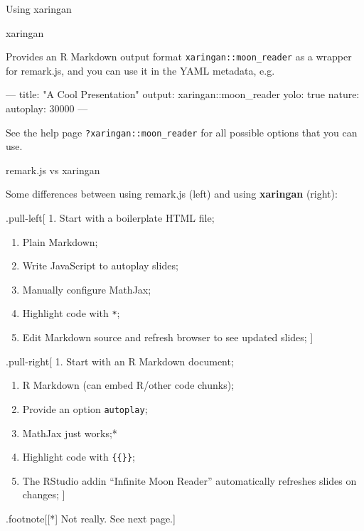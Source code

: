 \documentclass[ignorenonframetext,]{beamer}
\newenvironment{Shaded}{\begin{snugshade}}{\end{snugshade}}
\newcommand{\AttributeTok}[1]{\textcolor[rgb]{0.77,0.63,0.00}{#1}}
\newcommand{\FunctionTok}[1]{\textcolor[rgb]{0.00,0.00,0.00}{#1}}
\newcommand{\OtherTok}[1]{\textcolor[rgb]{0.56,0.35,0.01}{#1}}
\newcommand{\StringTok}[1]{\textcolor[rgb]{0.31,0.60,0.02}{#1}}
\begin{document}
\begin{frame}{Using xaringan}
\protect\hypertarget{using-xaringan}{}

\end{frame}

\begin{frame}[fragile]{xaringan}
\protect\hypertarget{xaringan}{}

Provides an R Markdown output format \texttt{xaringan::moon\_reader} as
a wrapper for remark.js, and you can use it in the YAML metadata, e.g.

\begin{Shaded}
\begin{Highlighting}[]
\OtherTok{---}
\FunctionTok{title:}\AttributeTok{ }\StringTok{"A Cool Presentation"}
\FunctionTok{output:}
  \FunctionTok{xaringan:}\AttributeTok{:moon_reader}
    \FunctionTok{yolo:}\AttributeTok{ true}
    \FunctionTok{nature:}
      \FunctionTok{autoplay:}\AttributeTok{ 30000}
\OtherTok{---}
\end{Highlighting}
\end{Shaded}

See the help page \texttt{?xaringan::moon\_reader} for all possible
options that you can use.

\end{frame}

\begin{frame}[fragile]{remark.js vs xaringan}
\protect\hypertarget{remark.js-vs-xaringan}{}

Some differences between using remark.js (left) and using
\textbf{xaringan} (right):

.pull-left{[} 1. Start with a boilerplate HTML file;

\begin{enumerate}
\item
  Plain Markdown;
\item
  Write JavaScript to autoplay slides;
\item
  Manually configure MathJax;
\item
  Highlight code with \texttt{*};
\item
  Edit Markdown source and refresh browser to see updated slides; {]}
\end{enumerate}

.pull-right{[} 1. Start with an R Markdown document;

\begin{enumerate}
\item
  R Markdown (can embed R/other code chunks);
\item
  Provide an option \texttt{autoplay};
\item
  MathJax just works;*
\item
  Highlight code with \texttt{\{\{\}\}};
\item
  The RStudio addin ``Infinite Moon Reader'' automatically refreshes
  slides on changes; {]}
\end{enumerate}

.footnote{[}{[}*{]} Not really. See next page.{]}

\end{frame}
\end{document}
